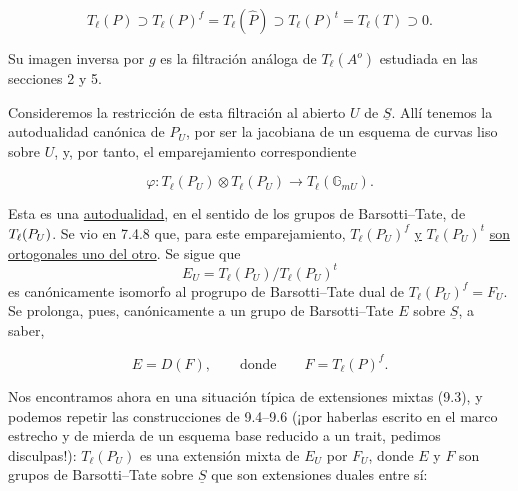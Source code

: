 \begin{equation}\tag{12.8.6}
 T_\ell(P)\supset T_\ell(P)^f=T_\ell(\widehat P)
 \supset T_\ell(P)^t=T_\ell(T)\supset0.
\end{equation}

\noindent
Su imagen inversa por $g$ es la filtración análoga de $T_\ell(A^{o})$
estudiada en las secciones 2 y 5.


Consideremos la restricción de esta filtración al abierto $U$ de
$\underline S$. Allí tenemos la autodualidad canónica de $P_U$, por ser
la jacobiana de un esquema de curvas liso sobre $U$, y, por tanto, el
emparejamiento correspondiente

\begin{equation}\tag{12.8.7}
 \varphi:T_\ell(P_U)\otimes T_\ell(P_U)
 \longrightarrow T_\ell(\mathbb G_{mU}).
\end{equation}

\noindent
Esta es una \underline{autodualidad}, en el sentido de los grupos de
Barsotti--Tate, de $T_\ell(\sisi{B_U}{P_U})$. Se vio en 7.4.8 que, para
este emparejamiento, $T_\ell(P_U)^f$ \underline{y} $T_\ell(P_U)^t$
\underline{son ortogonales uno del otro}. Se sigue que
\[
 E_U=T_\ell(P_U)/T_\ell(P_U)^t
\]
es canónicamente isomorfo al progrupo de Barsotti--Tate dual de
$T_\ell(P_U)^f=F_U$. Se prolonga, pues, canónicamente a un grupo de
Barsotti--Tate $E$ sobre $\underline S$, a saber,

\begin{equation}\tag{12.8.8}
 E=D(F),\qquad\text{donde}\qquad F=T_\ell(P)^f.
\end{equation}

\noindent
Nos encontramos ahora en una situación típica de extensiones mixtas
(9.3), y podemos repetir las construcciones de 9.4--9.6 (¡por haberlas
escrito en el marco estrecho y de mierda de un esquema base reducido a
un trait, pedimos disculpas!): $T_\ell(P_U)$ es una extensión mixta de
$E_U$ por $F_U$, donde $E$ y $F$ son grupos de Barsotti--Tate sobre
$\underline S$ que son extensiones duales entre sí:
